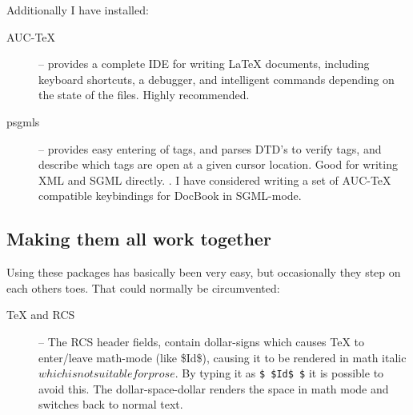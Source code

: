 Additionally I have installed:


\begin{description}
\item[AUC-TeX] -- provides a complete IDE for writing {\LaTeX}
  documents, including keyboard shortcuts, a debugger, and intelligent
  commands depending on the state of the files. Highly recommended.
\item[psgmls] -- provides easy entering of tags, and parses DTD's to
  verify tags, and describe which tags are open at a given cursor
  location.  Good for writing XML and SGML directly.
  .  I have considered writing a set of AUC-TeX
  compatible keybindings for DocBook in SGML-mode.
\end{description}



\subsection{Making them all work together}
\label{sec:making-them-all-work-together}

Using these packages has basically been very easy, but occasionally
they step on each others toes.  That could normally be circumvented:

\begin{description}
\item[{\TeX} and RCS] -- The RCS header fields, contain dollar-signs
  which causes {\TeX} to enter/leave math-mode (like
  \mbox{\$I}\mbox{d\$}), causing it to be rendered in math italic
  $which is not suitable for prose$.  By typing it as \texttt{\$
    \${}Id\$ \$} it is possible to avoid this. The dollar-space-dollar
  renders the space in math mode and switches back to normal text.


\end{description}

